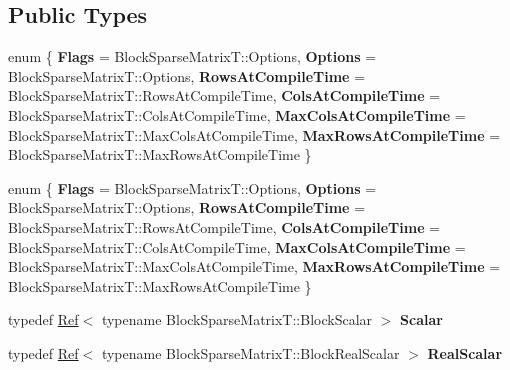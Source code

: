\subsection*{Public Types}
\begin{DoxyCompactItemize}
\item 
\mbox{\label{class_eigen_1_1_block_sparse_matrix_view_ac532dfb67d19cf432d65fc9d15c3aa5d}} 
enum \{ \newline
{\bfseries Flags} = Block\+Sparse\+MatrixT\+:\+:Options, 
{\bfseries Options} = Block\+Sparse\+MatrixT\+:\+:Options, 
{\bfseries Rows\+At\+Compile\+Time} = Block\+Sparse\+MatrixT\+:\+:Rows\+At\+Compile\+Time, 
{\bfseries Cols\+At\+Compile\+Time} = Block\+Sparse\+MatrixT\+:\+:Cols\+At\+Compile\+Time, 
\newline
{\bfseries Max\+Cols\+At\+Compile\+Time} = Block\+Sparse\+MatrixT\+:\+:Max\+Cols\+At\+Compile\+Time, 
{\bfseries Max\+Rows\+At\+Compile\+Time} = Block\+Sparse\+MatrixT\+:\+:Max\+Rows\+At\+Compile\+Time
 \}
\item 
\mbox{\label{class_eigen_1_1_block_sparse_matrix_view_ae9c4f7614940ea3a416d9ee01bd492a9}} 
enum \{ \newline
{\bfseries Flags} = Block\+Sparse\+MatrixT\+:\+:Options, 
{\bfseries Options} = Block\+Sparse\+MatrixT\+:\+:Options, 
{\bfseries Rows\+At\+Compile\+Time} = Block\+Sparse\+MatrixT\+:\+:Rows\+At\+Compile\+Time, 
{\bfseries Cols\+At\+Compile\+Time} = Block\+Sparse\+MatrixT\+:\+:Cols\+At\+Compile\+Time, 
\newline
{\bfseries Max\+Cols\+At\+Compile\+Time} = Block\+Sparse\+MatrixT\+:\+:Max\+Cols\+At\+Compile\+Time, 
{\bfseries Max\+Rows\+At\+Compile\+Time} = Block\+Sparse\+MatrixT\+:\+:Max\+Rows\+At\+Compile\+Time
 \}
\item 
\mbox{\label{class_eigen_1_1_block_sparse_matrix_view_a854f8029ce3db3acf6910cbaaa173985}} 
typedef \hyperlink{group___core___module_class_eigen_1_1_ref}{Ref}$<$ typename Block\+Sparse\+Matrix\+T\+::\+Block\+Scalar $>$ {\bfseries Scalar}
\item 
\mbox{\label{class_eigen_1_1_block_sparse_matrix_view_af67277170d4172bbe3cc899755bcef47}} 
typedef \hyperlink{group___core___module_class_eigen_1_1_ref}{Ref}$<$ typename Block\+Sparse\+Matrix\+T\+::\+Block\+Real\+Scalar $>$ {\bfseries Real\+Scalar}

\end{DoxyCompactItemize}
